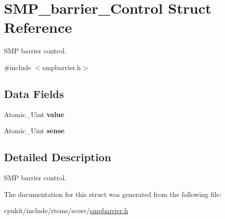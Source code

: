 \hypertarget{structSMP__barrier__Control}{}\section{S\+M\+P\+\_\+barrier\+\_\+\+Control Struct Reference}
\label{structSMP__barrier__Control}


S\+MP barrier control.  




{\ttfamily \#include $<$smpbarrier.\+h$>$}

\subsection*{Data Fields}
\begin{DoxyCompactItemize}
\item 
\mbox{\label{structSMP__barrier__Control_ade0f32bf48a9086e2ccf80b82d0aec0a}} 
Atomic\+\_\+\+Uint {\bfseries value}
\item 
\mbox{\label{structSMP__barrier__Control_a1cc91bd91978e271dcfa4747d04381a3}} 
Atomic\+\_\+\+Uint {\bfseries sense}
\end{DoxyCompactItemize}


\subsection{Detailed Description}
S\+MP barrier control. 

The documentation for this struct was generated from the following file\+:\begin{DoxyCompactItemize}
\item 
cpukit/include/rtems/score/\mbox{\hyperlink{smpbarrier_8h}{smpbarrier.\+h}}\end{DoxyCompactItemize}
